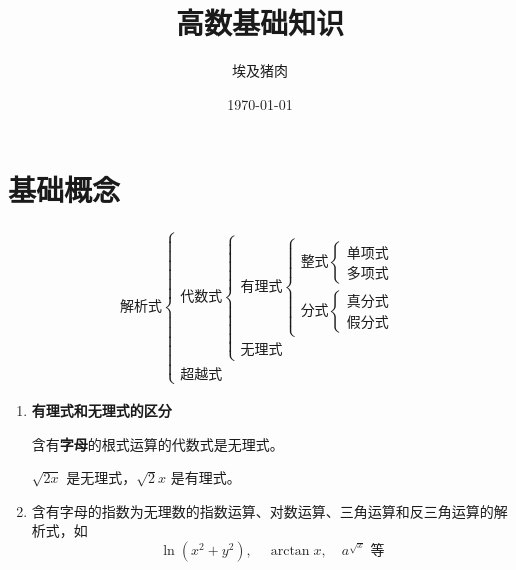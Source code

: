 \documentclass[UTF8]{ctexart}
\title{高数基础知识}
\author{埃及猪肉}
\date{\today}
\begin{document}
\maketitle
\tableofcontents


\section*{基础概念}

\[
\begin{aligned}
&\text{解析式} \begin{cases}
    \text{代数式} \begin{cases}
        \text{有理式} \begin{cases}
            \text{整式} \begin{cases}
                \text{单项式} \\
                \text{多项式}
            \end{cases} \\
            \text{分式} \begin{cases}
                \text{真分式} \\
                \text{假分式}
            \end{cases}
        \end{cases} \\
        \text{无理式}
    \end{cases} \\
    \text{超越式}
\end{cases}
\end{aligned}
\]

\vspace{1em}

\begin{enumerate}[label=\textcircled{\arabic*}]
    \item \textbf{有理式和无理式的区分}
    
    含有\textbf{字母}的根式运算的代数式是无理式。
    
    $\sqrt{2x}$ 是无理式，$\sqrt{2}x$ 是有理式。
    
    \item 含有字母的指数为无理数的指数运算、对数运算、三角运算和反三角运算的解析式，如
    \[
    \ln(x^2+y^2),\quad \arctan x,\quad a^{\sqrt{x}} \text{ 等}
    \]
\end{enumerate}
\end{document}
